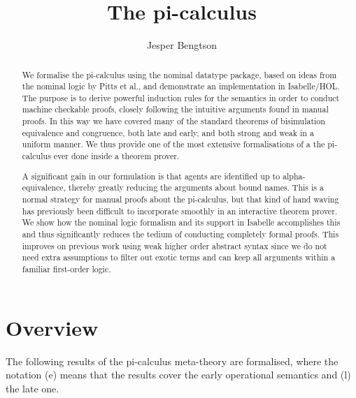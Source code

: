 \documentclass[11pt,a4paper]{article}
\begin{document}
\title{The pi-calculus}
\author{Jesper Bengtson}
\maketitle

\begin{abstract}
We formalise the pi-calculus using the nominal datatype package, based on ideas from the nominal logic by Pitts et al., and demonstrate an implementation in Isabelle/HOL. The purpose is to derive powerful induction rules for the semantics in order to conduct machine checkable proofs, closely following the intuitive arguments found in manual proofs. In this way we have covered many of the standard theorems of bisimulation equivalence and congruence, both late and early, and both strong and weak in a uniform manner. We thus provide one of the most extensive formalisations of a the pi-calculus ever done inside a theorem prover.

A significant gain in our formulation is that agents are identified up to alpha-equivalence, thereby greatly reducing the arguments about bound names. This is a normal strategy for manual proofs about the pi-calculus, but that kind of hand waving has previously been difficult to incorporate smoothly in an interactive theorem prover. We show how the nominal logic formalism and its support in Isabelle accomplishes this and thus significantly reduces the tedium of conducting completely formal proofs. This improves on previous work using weak higher order abstract syntax since we do not need extra assumptions to filter out exotic terms and can keep all arguments within a familiar first-order logic.
\end{abstract}

\tableofcontents

\section{Overview}

The following results of the pi-calculus meta-theory are formalised,
where the notation (e) means that the results cover the early
operational semantics and (l) the late one.
\end{document}
